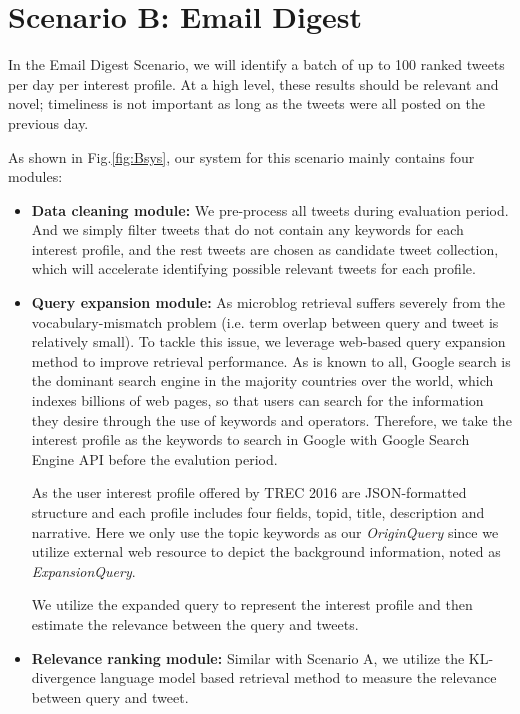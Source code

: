 \section{Scenario B: Email Digest}
In the Email Digest Scenario,
we will identify a batch of up to 100 ranked tweets per day per interest profile.
At a high level, these results should be relevant and novel;
timeliness is not important as long as the tweets were all posted on the previous day.

As shown in Fig.\ref{fig:Bsys}, our system for this scenario mainly contains four modules:

\begin{itemize}
\item \textbf{Data cleaning module:} We pre-process all tweets during evaluation period. And we simply filter tweets that do not contain any keywords for each interest profile, and the rest tweets are chosen as candidate tweet collection, which will accelerate identifying possible relevant tweets for each profile.

\item \textbf{Query expansion module:} As microblog retrieval suffers severely from the
vocabulary-mismatch problem (i.e. term overlap between query and tweet is relatively small). To tackle this issue, we leverage web-based query expansion method to improve retrieval performance. As is known to all, Google search is the dominant search engine in the majority countries over the world, which indexes billions\cite{arlington2008google} of web pages, so that users can search for the information they desire through the use of keywords and operators. Therefore, we take the interest profile as the keywords to search in Google with Google Search Engine API before the evalution period.

As the user interest profile offered by TREC 2016 are JSON-formatted structure and each profile includes four fields, topid, title, description and narrative.
Here we only use the topic keywords as our \emph{OriginQuery} since we utilize external web resource to depict the background information, noted as \emph{ExpansionQuery}.

We utilize the expanded query to represent the interest profile and then estimate the relevance between the query and tweets.

\item \textbf{Relevance ranking module:} Similar with Scenario A, we utilize the KL-divergence language model based retrieval method to measure the relevance between query and tweet.


\end{itemize}
